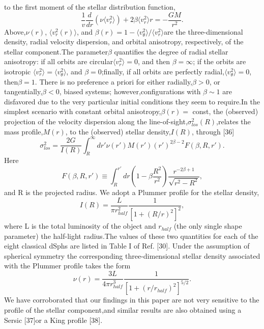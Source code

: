 \documentclass{article}
\begin{document}
\begin{multicols}{2}
to the first moment of the stellar distribution function, 
\begin{equation}
 {\frac{1}{v}}{\frac{d}{dr}}{(\nu {\langle v^2_r\rangle})}+ {2\beta{\langle v^2_r \rangle}r}= −{\frac{GM}{r^2}}.
\end{equation}
Above,$\nu(r)$, $\langle v^2_r(r)\rangle$,  and $\beta(r) = 1−\langle v^2_\theta \rangle/\langle {v_r^2}\rangle$are the three-dimensional density, radial velocity dispersion, and orbital anisotropy, respectively, of the stellar component.The  parameter$\beta$ quantifies  the  degree  of  radial  stellar anisotropy:  if all orbits are circular$\langle v^2_r \rangle = 0$, and then $\beta =\infty$; if the orbits are isotropic $\langle v^2_r \rangle =\langle v^2_\theta \rangle$, and $\beta= 0$;finally,  if  all  orbits  are  perfectly  radial,$\langle v^2_\theta\rangle=  0$,  then$\beta= 1$.  There is no preference a priori for either radially,$\beta >0$, or tangentially,$\beta <0$, biased systems; however,configurations with $\beta \sim1$ are disfavored due to the very particular initial conditions they seem to require.In   the   simplest   scenario   with   constant   orbital anisotropy,$\beta(r)  =$  const,  the  (observed)  projection  of the  velocity  dispersion  along  the  line-of-sight,$\sigma^2_{los}(R)$,relates the mass profile,$M(r)$, to the (observed) stellar density,$I(R)$, through [36]
\begin{equation}
{\sigma^2_{los}}={\frac{2G}{I(R)}}{\int_{R}^{\infty}dr'\nu(r')M(r')(r')^{2\beta−2}F(\beta,R,r')}.
\end{equation}
Here
\begin{equation}
F(\beta,R,r') \equiv {\int_{R}^{r'}dr\left(1−\beta{\frac{R^2}{r^2}}\right){\frac{r^{-2\beta +1}}{\sqrt{r^2-R^2}}}},    
\end{equation}
and R is  the  projected  radius.   We  adopt  a  Plummer profile for the stellar density,
\begin{equation}
I(R) ={\frac{L}{\pi r^2_{half}}}{\frac{1}{[1+(R/r)^2]^2}},   
\end{equation}
where L is  the  total  luminosity  of  the  object  and $r_{half}$ (the only single shape parameter) the half-light radius.The values of these two quantities for each of the eight classical dSphs are listed in Table I of Ref. [30].  Under the  assumption  of  spherical  symmetry  the  corresponding three-dimensional stellar density associated with the Plummer profile takes the form 
\begin{equation}
\nu(r) ={\frac{3L}{4\pi r^3_{half}}}{\frac{1}{[1+(r/r_{half})^2]^{5/2}}}.    
\end{equation}
We have corroborated that our findings in this paper are not very sensitive to the profile of the stellar component,and similar results are also obtained using a Sersic [37]or a King profile [38].
\end{multicols}
\end{document}

